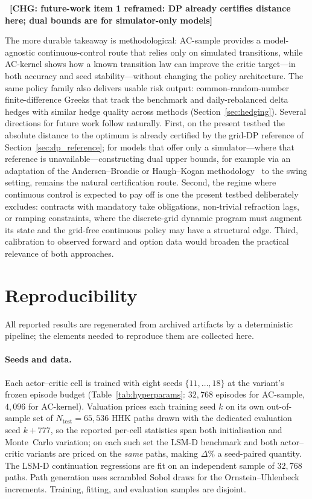 \documentclass[a4paper,fleqn]{cas-dc}
\newcommand{\hlblock}[1]{\par\noindent
    \colorbox{chgyellow}{\parbox{\dimexpr\linewidth-2\fboxsep\relax}{#1}}\par}
\newcommand{\hlblock}[1]{#1}
\newcommand{\chg}[1]{{\normalfont\bfseries\color{red}~[CHG: \textsf{\footnotesize #1}]~}}
\newcommand{\chg}[1]{}
\begin{document}
\chg{future-work item 1 reframed: DP already certifies distance here; dual bounds are for simulator-only models}%
\hlblock{The more durable takeaway is methodological: AC-sample provides a model-agnostic continuous-control route that relies only on simulated transitions, while AC-kernel shows how a known transition law can improve the critic target---in both accuracy and seed stability---without changing the policy architecture. The same policy family also delivers usable risk output: common-random-number finite-difference Greeks that track the benchmark and daily-rebalanced delta hedges with similar hedge quality across methods (Section~\ref{sec:hedging}). Several directions for future work follow naturally. First, on the present testbed the absolute distance to the optimum is already certified by the grid-DP reference of Section~\ref{sec:dp_reference}; for models that offer only a simulator---where that reference is unavailable---constructing dual upper bounds, for example via an adaptation of the Andersen--Broadie or Haugh--Kogan methodology~\cite{andersen2004primal,haugh2004pricing} to the swing setting, remains the natural certification route. Second, the regime where continuous control is expected to pay off is one the present testbed deliberately excludes: contracts with mandatory take obligations, non-trivial refraction lags, or ramping constraints, where the discrete-grid dynamic program must augment its state and the grid-free continuous policy may have a structural edge. Third, calibration to observed forward and option data would broaden the practical relevance of both approaches.}

\appendix

\section{Reproducibility}
\label{appendix:reproducibility}

All reported results are regenerated from archived artifacts by a deterministic pipeline; the elements needed to reproduce them are collected here.

\paragraph{Seeds and data.} Each actor--critic cell is trained with eight seeds $\{11,\dots,18\}$ at the variant's frozen episode budget (Table~\ref{tab:hyperparams}: $32{,}768$ episodes for AC-sample, $4{,}096$ for AC-kernel). Valuation prices each training seed $k$ on its own out-of-sample set of $N_{\mathrm{test}}=65{,}536$ HHK paths drawn with the dedicated evaluation seed $k+777$, so the reported per-cell statistics span both initialisation and Monte~Carlo variation; on each such set the LSM-D benchmark and both actor--critic variants are priced on the \emph{same} paths, making $\Delta\%$ a seed-paired quantity. The LSM-D continuation regressions are fit on an independent sample of $32{,}768$ paths. Path generation uses scrambled Sobol draws for the Ornstein--Uhlenbeck increments. Training, fitting, and evaluation samples are disjoint.
\end{document}
